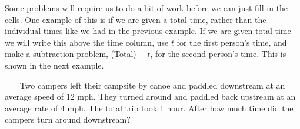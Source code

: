  Some problems will require us to do a bit of work before we can just fill in
the cells. One example of this is if we are given a total time, rather than
the individual times like we had in the previous example. If we are given
total time we will write this above the time column, use $t$ for the first
person's time, and make a subtraction problem, (Total) $-~t$, for the
second person's time. This is shown in the next example.

\begin{example}\label{Lin88}~~~ Two campers left their campsite by canoe and paddled downstream at an average speed of 12 mph. They turned around and paddled back upstream at an average rate of 4 mph. The total trip took 1 hour. After how much time did the campers turn around downstream?

\pagebreak


\end{example}
